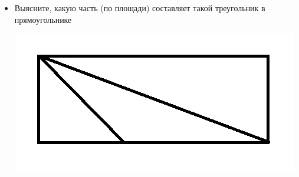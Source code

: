 \documentclass[10pt]{scrbook} \usepackage{modules/nonstahp_book}
\begin{document}
\begin{itemize}
\begin{center}
\end{center}
\item Выясните, какую часть (по площади) составляет такой треугольник в прямоугольнике
\begin{center}
\includegraphics[width=0.7\linewidth]{Area3.png}%
\end{center}
\end{itemize}
















\end{document}
